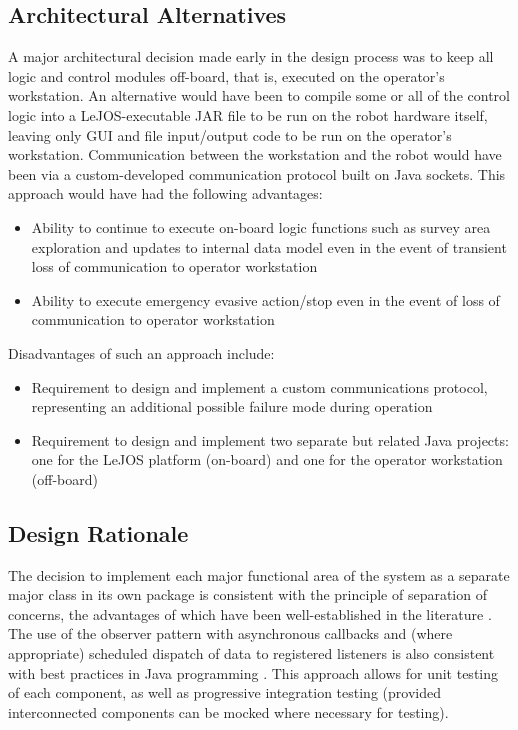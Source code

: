 \documentclass[12pt]{article}
\begin{document}
\FloatBarrier
\subsection{Architectural Alternatives}\label{alternative}
A major architectural decision made early in the design process was to keep all logic and control modules off-board, that is, executed on the operator's workstation. An alternative would have been to compile some or all of the control logic into a LeJOS-executable JAR file to be run on the robot hardware itself, leaving only GUI and file input/output code to be run on the operator's workstation. Communication between the workstation and the robot would have been via a custom-developed communication protocol built on Java sockets. This approach would have had the following advantages:
\begin{itemize}
\item Ability to continue to execute on-board logic functions such as survey area exploration and updates to internal data model even in the event of transient loss of communication to operator workstation
\item Ability to execute emergency evasive action/stop even in the event of loss of communication to operator workstation
\end{itemize}
Disadvantages of such an approach include:
\begin{itemize}
\item Requirement to design and implement a custom communications protocol, representing an additional possible failure mode during operation
\item Requirement to design and implement two separate but related Java projects: one for the LeJOS platform (on-board) and one for the operator workstation (off-board)
\end{itemize}

\subsection{Design Rationale}\label{rationale}
The decision to implement each major functional area of the system as a separate major class in its own package is consistent with the principle of separation of concerns, the advantages of which have been well-established in the literature \cite{hursch}. The use of the observer pattern with asynchronous callbacks and (where appropriate) scheduled dispatch of data to registered listeners is also consistent with best practices in Java programming \cite{buschmann}. This approach allows for unit testing of each component, as well as progressive integration testing (provided interconnected components can be mocked where necessary for testing).
\end{document}
